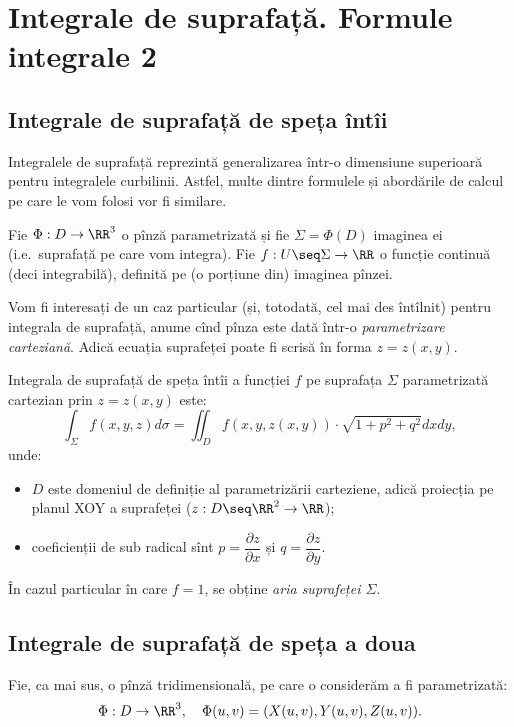\chapter{Integrale de suprafață. Formule integrale 2}

\section{Integrale de suprafață de speța întîi}
Integralele de suprafață reprezintă generalizarea într-o dimensiune
superioară pentru integralele curbilinii. Astfel, multe dintre formulele
și abordările de calcul pe care le vom folosi vor fi similare.

Fie $ \Phi : D \to \RR^3 $ o pînză parametrizată și fie $ \Sigma = \Phi(D) $
imaginea ei (i.e.\ suprafață pe care vom integra). Fie $ f : U \seq \Sigma \to \RR $
o funcție continuă (deci integrabilă), definită pe (o porțiune din) imaginea
pînzei.

Vom fi interesați de un caz particular (și, totodată, cel mai des întîlnit) pentru
integrala de suprafață, anume cînd pînza este dată într-o \emph{parametrizare %
  carteziană}. Adică ecuația suprafeței poate fi scrisă în forma $ z = z(x, y) $.

Integrala de suprafață de speța întîi a funcției $ f $ pe suprafața $ \Sigma $
parametrizată cartezian prin $ z = z(x, y) $ este:
\[
  \int_\Sigma f(x, y, z) d\sigma = \iint_D f(x, y, z(x, y)) \cdot %
  \sqrt{1 + p^2 + q^2} dxdy,
\]
unde:
\begin{itemize}
\item $ D $ este domeniul de definiție al parametrizării carteziene,
  adică proiecția pe planul XOY a suprafeței ($ z : D \seq \RR^2 \to \RR $);
\item coeficienții de sub radical sînt $ p = \dfrac{\partial z}{\partial x} $
  și $ q = \dfrac{\partial z}{\partial y} $.
\end{itemize}

În cazul particular în care $ f = 1 $, se obține \emph{aria suprafeței $ \Sigma $}.


\section{Integrale de suprafață de speța a doua}
Fie, ca mai sus, o pînză tridimensională, pe care o considerăm a fi parametrizată:
\[
  \Phi : D \to \RR^3, \quad \Phi(u, v) = (X(u, v), Y(u, v), Z(u, v)).
\]

